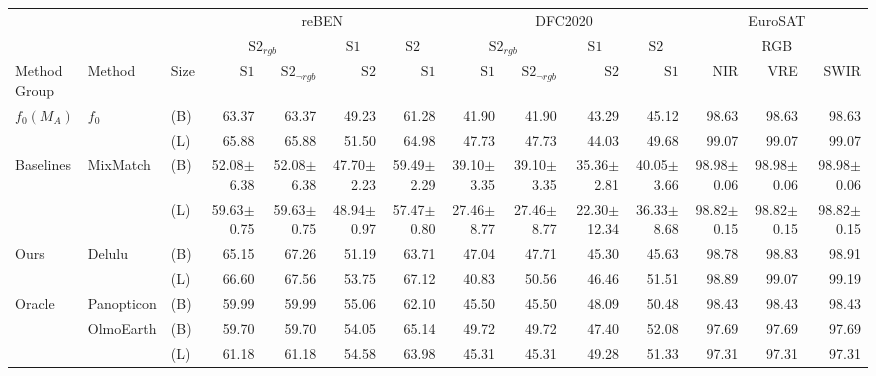\begin{tabular}{lll | r r r r | r r r r | r r r}
\toprule
  \multicolumn{3}{c}{} & \multicolumn{4}{c|}{reBEN} & \multicolumn{4}{c|}{DFC2020} & \multicolumn{3}{c}{EuroSAT} \\
  \multicolumn{3}{c}{} & \multicolumn{2}{c}{$\mathrm{S2}_{rgb}$} & \multicolumn{1}{c}{$\mathrm{S1}$} & \multicolumn{1}{c|}{$\mathrm{S2}$} & \multicolumn{2}{c}{$\mathrm{S2}_{rgb}$} & \multicolumn{1}{c}{$\mathrm{S1}$} & \multicolumn{1}{c|}{$\mathrm{S2}$} & \multicolumn{3}{c}{RGB} \\
  \shortstack[c]{Method\\Group} & Method & Size & $\mathrm{S1}$ & $\mathrm{S2}_{\neg rgb}$ & $\mathrm{S2}$ & $\mathrm{S1}$ & $\mathrm{S1}$ & $\mathrm{S2}_{\neg rgb}$ & $\mathrm{S2}$ & $\mathrm{S1}$ & NIR & VRE & SWIR \\
  \midrule
  \multirow{2}{*}{$f_0(M_A)$} & \multirow{2}{*}{$f_0$} & (B) & 63.37 & 63.37 & 49.23 & 61.28 & 41.90 & 41.90 & 43.29 & 45.12 & 98.63 & 98.63 & 98.63 \\
   &  & (L) & 65.88 & 65.88 & 51.50 & 64.98 & 47.73 & 47.73 & 44.03 & 49.68 & 99.07 & 99.07 & 99.07 \\
  \midrule
  \multirow{2}{*}{Baselines} & \multirow{2}{*}{MixMatch} & (B) & 52.08$\pm$6.38 & 52.08$\pm$6.38 & 47.70$\pm$2.23 & 59.49$\pm$2.29 & 39.10$\pm$3.35 & 39.10$\pm$3.35 & 35.36$\pm$2.81 & 40.05$\pm$3.66 & 98.98$\pm$0.06 & 98.98$\pm$0.06 & 98.98$\pm$0.06 \\
   &  & (L) & 59.63$\pm$0.75 & 59.63$\pm$0.75 & 48.94$\pm$0.97 & 57.47$\pm$0.80 & 27.46$\pm$8.77 & 27.46$\pm$8.77 & 22.30$\pm$12.34 & 36.33$\pm$8.68 & 98.82$\pm$0.15 & 98.82$\pm$0.15 & 98.82$\pm$0.15 \\
  \midrule
  \multirow{2}{*}{Ours} & \multirow{2}{*}{Delulu} & (B) & 65.15 & 67.26 & 51.19 & 63.71 & 47.04 & 47.71 & 45.30 & 45.63 & 98.78 & 98.83 & 98.91 \\
   &  & (L) & 66.60 & 67.56 & 53.75 & 67.12 & 40.83 & 50.56 & 46.46 & 51.51 & 98.89 & 99.07 & 99.19 \\
  \midrule
  \multirow{3}{*}{Oracle} & Panopticon & (B) & 59.99 & 59.99 & 55.06 & 62.10 & 45.50 & 45.50 & 48.09 & 50.48 & 98.43 & 98.43 & 98.43 \\
   & \multirow{2}{*}{OlmoEarth} & (B) & 59.70 & 59.70 & 54.05 & 65.14 & 49.72 & 49.72 & 47.40 & 52.08 & 97.69 & 97.69 & 97.69 \\
   &  & (L) & 61.18 & 61.18 & 54.58 & 63.98 & 45.31 & 45.31 & 49.28 & 51.33 & 97.31 & 97.31 & 97.31 \\
\bottomrule
\end{tabular}


